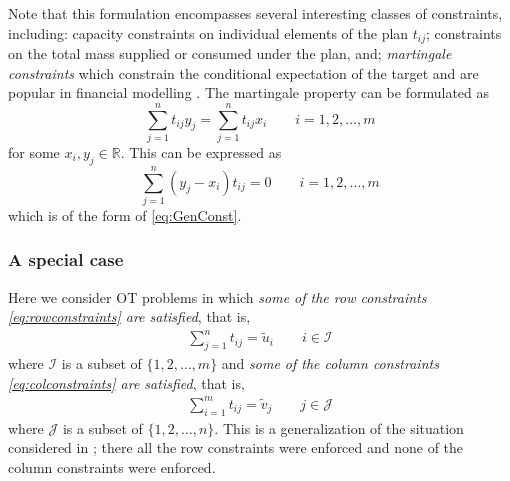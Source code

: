 \documentclass[twocolumn]{article}
\begin{document}
Note that this formulation encompasses several interesting classes of constraints, including: capacity constraints on individual elements of the plan $t_{ij}$; constraints on the total mass supplied or consumed under the plan, and; \textit{martingale constraints} which constrain the conditional expectation of the target and are popular in financial modelling \cite{galichon2014stochastic}.
%
%
The martingale property can be formulated as
\begin{equation}
\sum_{j=1}^nt_{ij}y_j =  \sum_{j=1}^nt_{ij} x_i \qquad i =1,2, \dots, m
\end{equation}
    for some $x_i, y_j \in \mathbb{R}$.
    This can be expressed as
\begin{equation}
\sum_{j=1}^n(y_j-x_i)t_{ij} =0 \qquad i =1,2, \dots, m
\label{eq:martingale_constraint}
\end{equation}
which is of the form of \eqref{eq:GenConst}. 


\subsubsection{A special case}
Here we consider OT problems in which {\em some of the row constraints \eqref{eq:rowconstraints} are satisfied}, that is,
\begin{align}
\label{eq:rowconstraints1}
\sum_{j=1}^nt_{ij}  = \tilde{u}_i  \qquad i \in \mathcal{I}
\end{align}
where $\mathcal{I}$ is a  subset of $\{1,2,\dots, m\}$ and
 {\em some of  the column constraints \eqref{eq:colconstraints} are satisfied}, that is,
\begin{align}
\label{eq:colconstraints1}
\sum_{i=1}^m t_{ij} = \tilde{v}_j  \qquad j \in \mathcal{J} 
\end{align}
where $\mathcal{J}$ is a  subset of $\{1,2,\dots, n\}$.
This is a generalization of the situation considered in \cite{martin}; there all the row constraints were enforced and none of the column constraints were enforced.
\end{document}
